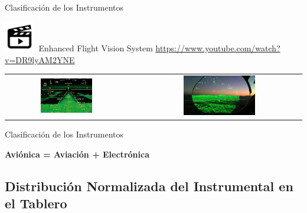 \documentclass[10pt]{beamer}
\begin{document}
\begin{frame}{Clasificaci\'on de los Instrumentos}



\vspace{3mm}

{\includegraphics[width=0.1\textwidth]{imagenes/Video.png}}\,
Enhanced Flight Vision System \url{https://www.youtube.com/watch?v=DR9lyAM2YNE}

\vspace{3mm}

  \begin{tabular}{ccc}
    \includegraphics[width=0.45\textwidth]{imagenes/1.2.clasificacion.instrumentos/EFVS_Photo.jpg} & \hspace{3mm}
    &     \includegraphics[width=0.45\textwidth]{imagenes/1.2.clasificacion.instrumentos/efvs.jpg} \\
  \end{tabular}
  

\end{frame}



\begin{frame}{Clasificaci\'on de los Instrumentos}

{\Large \bf Avi\'onica = Aviaci\'on + Electr\'onica}

\end{frame}


\subsection{Distribuci\'on Normalizada del Instrumental en el Tablero}
\label{sec:distribucion.normalizada.instrumental.en.el.tablero}
\end{document}
